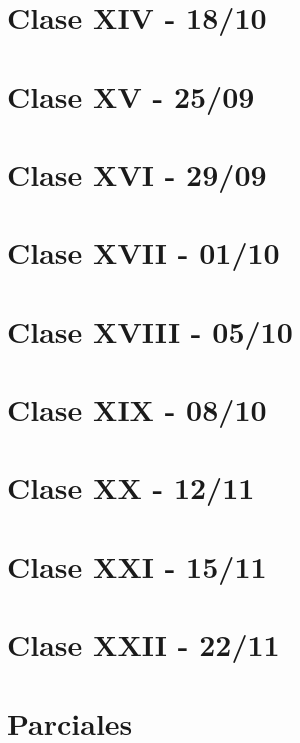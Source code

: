 \documentclass[12pt,a4paper]{book}
\begin{document}
\chapter{Clase XIV - 18/10}

\newpage\thispagestyle{empty}\blankpage

\chapter{Clase XV - 25/09}

\newpage\thispagestyle{empty}\blankpage

\chapter{Clase XVI - 29/09}

\newpage\thispagestyle{empty}\blankpage

\chapter{Clase XVII - 01/10}

\newpage\thispagestyle{empty}\blankpage

\chapter{Clase XVIII - 05/10}

\newpage\thispagestyle{empty}\blankpage

\chapter{Clase XIX - 08/10}

\newpage\thispagestyle{empty}\blankpage

\chapter{Clase XX - 12/11}

\newpage\thispagestyle{empty}\blankpage

\chapter{Clase XXI - 15/11}

\newpage\thispagestyle{empty}\blankpage

\chapter{Clase XXII - 22/11}

\newpage\thispagestyle{empty}\blankpage



\chapter{Parciales}


\blankpage



\nocite{*}
\end{document}
